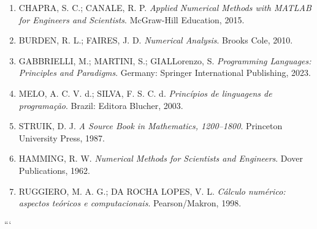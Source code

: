 \begin{enumerate}
  \item CHAPRA, S. C.; CANALE, R. P.
        \textit{Applied Numerical Methods with MATLAB for Engineers and Scientists}.
        McGraw-Hill Education, 2015.

  \item BURDEN, R. L.; FAIRES, J. D.
        \textit{Numerical Analysis}.
        Brooks Cole, 2010.

  \item GABBRIELLI, M.; MARTINI, S.; GIALLorenzo, S.
        \textit{Programming Languages: Principles and Paradigms}.
        Germany: Springer International Publishing, 2023.

  \item MELO, A. C. V. d.; SILVA, F. S. C. d.
        \textit{Princípios de linguagens de programação}.
        Brazil: Editora Blucher, 2003.

  \item STRUIK, D. J.
        \textit{A Source Book in Mathematics, 1200--1800}.
        Princeton University Press, 1987.

  \item HAMMING, R. W.
        \textit{Numerical Methods for Scientists and Engineers}.
        Dover Publications, 1962.

  \item RUGGIERO, M. A. G.; DA ROCHA LOPES, V. L.
        \textit{Cálculo numérico: aspectos teóricos e computacionais}.
        Pearson/Makron, 1998.
\end{enumerate}



```